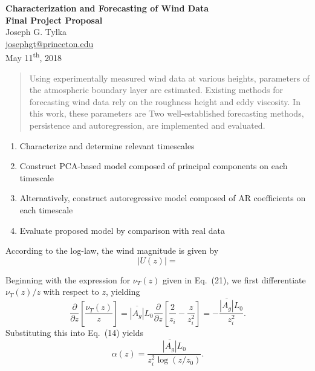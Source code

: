 \documentclass[11pt, oneside]{article}
\begin{document}
\begin{centering}
{\Large \textbf{Characterization and Forecasting of Wind Data}}\\
\vspace{\baselineskip}
{\large \textbf{Final Project Proposal}}\\
\vspace{\baselineskip}
Joseph G. Tylka\\
\href{mailto:josephgt@princeton.edu}{josephgt@princeton.edu}\\
\vspace{\baselineskip}
May 11\textsuperscript{th}, 2018\\
\end{centering}

\begin{abstract}
Using experimentally measured wind data at various heights, parameters of the atmospheric boundary layer are estimated.
Existing methods for forecasting wind data rely on the roughness height and eddy viscosity.
In this work, these parameters are
Two well-established forecasting methods, persistence and autoregression, are implemented and evaluated.

\end{abstract}


\begin{enumerate}
\item Characterize and determine relevant timescales
\item Construct PCA-based model composed of principal components on each timescale
\item Alternatively, construct autoregressive model composed of AR coefficients on each timescale
\item Evaluate proposed model by comparison with real data
\end{enumerate}

According to the log-law, the wind magnitude is given by
\begin{equation}
|U(z)| = 
\end{equation}

Beginning with the expression for $\nu_T(z)$ given in Eq.~(21), we first differentiate $\nu_T(z)/z$ with respect to $z$, yielding
\begin{equation}
\frac{\partial}{\partial z} \left[ \frac{\nu_T(z)}{z} \right] = \overline{|A_g|} L_0 \frac{\partial}{\partial z} \left[ \frac{2}{z_i} - \frac{z}{z_i^2} \right] = -\frac{\overline{|A_g|} L_0}{z_i^2}.
\end{equation}
Substituting this into Eq.~(14) yields
\begin{equation}
\alpha(z) = \frac{\overline{|A_g|} L_0}{z_i^2 \log(z/z_0)}.
\end{equation}
\end{document}
